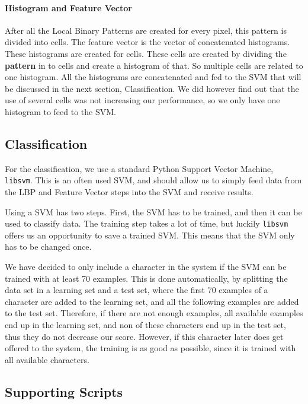 \documentclass[a4paper]{article}
\begin{document}
\paragraph*{Histogram and Feature Vector}
After all the Local Binary Patterns are created for every pixel, this pattern
is divided into cells. The feature vector is the vector of concatenated
histograms. These histograms are created for cells. These cells are created by
dividing the \textbf{pattern} in to cells and create a histogram of that. So
multiple cells are related to one histogram. All the histograms are
concatenated and fed to the SVM that will be discussed in the next section,
Classification. We did however find out that the use of several cells was not
increasing our performance, so we only have one histogram to feed to the SVM.

\subsection{Classification}

For the classification, we use a standard Python Support Vector Machine,
\texttt{libsvm}. This is an often used SVM, and should allow us to simply feed
data from the LBP and Feature Vector steps into the SVM and receive results.

Using a SVM has two steps. First, the SVM has to be trained, and then it can be
used to classify data. The training step takes a lot of time, but luckily
\texttt{libsvm} offers us an opportunity to save a trained SVM. This means that
the SVM only has to be changed once.

We have decided to only include a character in the system if the SVM can be
trained with at least 70 examples. This is done automatically, by splitting the
data set in a learning set and a test set, where the first 70 examples of a
character are added to the learning set, and all the following examples are
added to the test set. Therefore, if there are not enough examples, all
available examples end up in the learning set, and non of these characters end
up in the test set, thus they do not decrease our score. However, if this
character later does get offered to the system, the training is as good as
possible, since it is trained with all available characters.

\subsection{Supporting Scripts}
\end{document}
